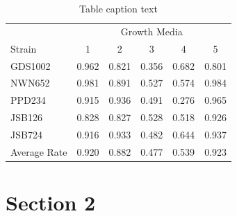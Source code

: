 \documentclass{tufte-book} %
\begin{document}
\begin{table} %
\centering %
\begin{tabular}{l c c c c c} %
\toprule %
& \multicolumn{5}{c}{Growth Media} \\ %
\cmidrule(l){2-6} %
Strain & 1 & 2 & 3 & 4 & 5\\ %
\midrule %
GDS1002 & 0.962 & 0.821 & 0.356 & 0.682 & 0.801\\ %
NWN652 & 0.981 & 0.891 & 0.527 & 0.574 & 0.984\\ %
PPD234 & 0.915 & 0.936 & 0.491 & 0.276 & 0.965\\ %
JSB126 & 0.828 & 0.827 & 0.528 & 0.518 & 0.926\\ %
JSB724 & 0.916 & 0.933 & 0.482 & 0.644 & 0.937\\ %
\midrule %
\midrule %
Average Rate & 0.920 & 0.882 & 0.477 & 0.539 & 0.923\\ %
\bottomrule %
\end{tabular}
\caption{Table caption text} %
\label{tab:template} %
\end{table}



\section{Section 2}
\end{document}
